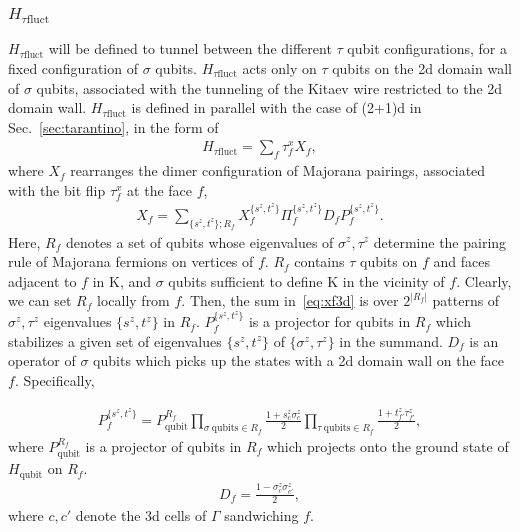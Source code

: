 \documentclass[12pt]{article}
\numberwithin{equation}{section}
\begin{document}
\subsubsection{$H_{\tau\mathrm{fluct}}$}
$H_{\tau\mathrm{fluct}}$ will be defined to tunnel between the different $\tau$ qubit configurations, for a fixed configuration of $\sigma$ qubits. $H_{\tau\mathrm{fluct}}$ acts only on $\tau$ qubits on the 2d domain wall of $\sigma$ qubits, associated with the tunneling of the Kitaev wire restricted to the 2d domain wall. 
$H_{\tau\mathrm{fluct}}$ is defined in parallel with the case of (2+1)d in Sec.~\ref{sec:tarantino}, in the form of
\begin{align}
    H_{\tau\mathrm{fluct}}=\sum_f\tau_f^x X_f,
    \label{eq:htfluct}
\end{align}
where $X_f$ rearranges the dimer configuration of Majorana pairings, associated with the bit flip $\tau_f^x$ at the face $f$,
\begin{align}
    X_f=\sum_{\{s^z,t^z\};  R_f}X_f^{\{s^z,t^z\}}\Pi_f^{\{s^z,t^z\}}D_fP_f^{\{s^z,t^z\}}.
    \label{eq:xf3d}
\end{align}
Here, $R_f$ denotes a set of qubits whose eigenvalues of $\sigma^z, \tau^z$ determine the pairing rule of Majorana fermions on vertices of $f$. 
$R_f$ contains $\tau$ qubits on $f$ and faces adjacent to $f$ in $\mathrm{K}$, and $\sigma$ qubits sufficient to define $\mathrm{K}$ in the vicinity of $f$.
Clearly, we can set $R_f$ locally from $f$.
Then, the sum in~\eqref{eq:xf3d} is over $2^{|R_f|}$ patterns of $\sigma^z, \tau^z$ eigenvalues $\{s^z,t^z\}$ in $R_f$.  $P_{f}^{\{s^z,t^z\}}$ is a projector for qubits in $R_f$ which stabilizes a given set of eigenvalues $\{s^z, t^z\}$ of $\{\sigma^z,\tau^z\}$ in the summand. 
$D_f$ is an operator of $\sigma$ qubits which picks up the states with a 2d domain wall on the face $f$. Specifically,

\begin{align}
    P_{f}^{\{s^z,t^z\}}=P_{\mathrm{qubit}}^{R_f}\prod_{\sigma\ \mathrm{qubits}\in R_f}
    \frac{1+s^z_{c}\sigma^z_{c}}{2}\prod_{\tau\ \mathrm{qubits}\in R_f}
    \frac{1+t^z_{f'}\tau^z_{f'}}{2},
\end{align}
where $P_{\mathrm{qubit}}^{R_f}$ is a projector of qubits in $R_f$ which projects onto the ground state of $H_{\mathrm{qubit}}$ on $R_f$.
\begin{align}
    D_f=\frac{1-\sigma_c^z\sigma_{c'}^z}{2},
\end{align}
where $c, c'$ denote the 3d cells of $\Gamma$ sandwiching $f$.
\end{document}
